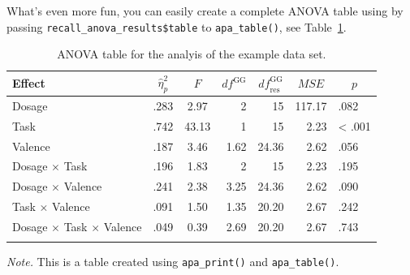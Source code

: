 \documentclass[
  man,floatsintext]{apa6}
\newenvironment{Shaded}{\begin{snugshade}}{\end{snugshade}}
\newcommand{\AttributeTok}[1]{\textcolor[rgb]{0.13,0.29,0.53}{#1}}
\newcommand{\FunctionTok}[1]{\textcolor[rgb]{0.13,0.29,0.53}{\textbf{#1}}}
\newcommand{\NormalTok}[1]{#1}
\newcommand{\SpecialCharTok}[1]{\textcolor[rgb]{0.81,0.36,0.00}{\textbf{#1}}}
\newcommand{\StringTok}[1]{\textcolor[rgb]{0.31,0.60,0.02}{#1}}
\begin{document}
What's even more fun, you can easily create a complete ANOVA table using by passing \texttt{recall\_anova\_results\$table} to \texttt{apa\_table()}, see Table~\ref{tab:anova}.





\begin{Shaded}
\end{Shaded}

\begin{table}[tbp]

\begin{center}
\begin{threeparttable}

\caption{\label{tab:anova}ANOVA table for the analyis of the example data set.}

\begin{tabular}{lrcrrrl}
\toprule
Effect & \multicolumn{1}{c}{$\hat{\eta}^2_p$} & \multicolumn{1}{c}{$F$} & \multicolumn{1}{c}{$\mathit{df}^{\mathrm{GG}}$} & \multicolumn{1}{c}{$\mathit{df}_{\mathrm{res}}^{\mathrm{GG}}$} & \multicolumn{1}{c}{$\mathit{MSE}$} & \multicolumn{1}{c}{$p$}\\
\midrule
Dosage & .283 & 2.97 & 2 & 15 & 117.17 & .082\\
Task & .742 & 43.13 & 1 & 15 & 2.23 & < .001\\
Valence & .187 & 3.46 & 1.62 & 24.36 & 2.62 & .056\\
Dosage $\times$ Task & .196 & 1.83 & 2 & 15 & 2.23 & .195\\
Dosage $\times$ Valence & .241 & 2.38 & 3.25 & 24.36 & 2.62 & .090\\
Task $\times$ Valence & .091 & 1.50 & 1.35 & 20.20 & 2.67 & .242\\
Dosage $\times$ Task $\times$ Valence & .049 & 0.39 & 2.69 & 20.20 & 2.67 & .743\\
\bottomrule
\addlinespace
\end{tabular}

\begin{tablenotes}[para]
\normalsize{\textit{Note.} This is a table created using \texttt{apa\_print()} and \texttt{apa\_table()}.}
\end{tablenotes}

\end{threeparttable}
\end{center}

\end{table}
\end{document}
